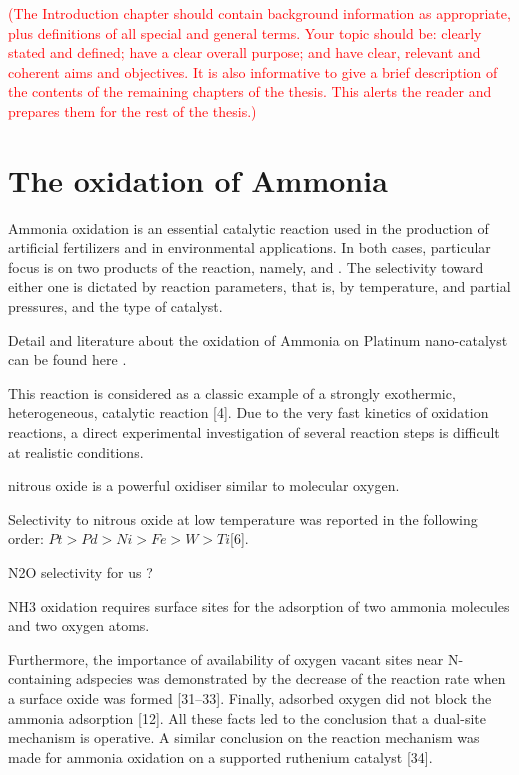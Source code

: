 \textcolor{red}{(The Introduction chapter should contain background information as appropriate, plus definitions of all special and general terms. Your topic should be: clearly stated and defined; have a clear overall purpose; and have clear, relevant and coherent aims and objectives. It is also informative to give a brief description of the contents of the remaining chapters of the thesis. This alerts the reader and prepares them for the rest of the thesis.)}

\section{The oxidation of Ammonia}

Ammonia oxidation is an essential catalytic reaction used in the production of artificial fertilizers and in environmental applications. In both cases, particular focus is on two products of the reaction, namely, \nitricoxide and \nitrogen. The selectivity toward either one is dictated by reaction parameters, that is, by temperature, \ammonia and \dioxygen partial pressures, and the type of catalyst.

Detail and literature about the oxidation of Ammonia on Platinum nano-catalyst can be found here \parencite{Resta2020a}.


This reaction is considered as a classic example of a strongly exothermic, heterogeneous, catalytic reaction [4].
Due to the very fast kinetics of oxidation reactions, a direct experimental investigation of several reaction steps is difficult at realistic conditions.

nitrous oxide is a powerful oxidiser similar to molecular oxygen.

Selectivity to nitrous oxide at low temperature was reported in the following order: $Pt > Pd > Ni > Fe > W > Ti $[6].

N2O selectivity for us ?

NH3 oxidation requires surface sites for the adsorption of two ammonia molecules and two oxygen atoms.

Furthermore, the importance of availability of oxygen vacant sites near N-containing adspecies was demonstrated by the decrease of the reaction rate when a surface oxide was formed [31–33].
Finally, adsorbed oxygen did not block the ammonia adsorption [12].
All these facts led to the conclusion that a dual-site mechanism is operative.
A similar conclusion on the reaction mechanism was made for ammonia oxidation on a supported ruthenium catalyst [34].

